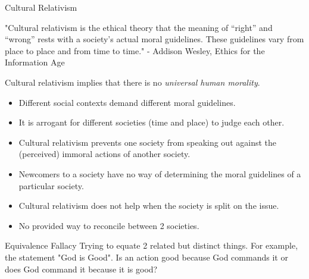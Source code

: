 \documentclass[]{../../DefinitionFormat}
\begin{document}
\begin{definition}{Cultural Relativism}
	\begin{summary}
		"Cultural relativism is the ethical theory that the meaning of “right” and “wrong”
		rests with a society’s actual moral guidelines. These guidelines vary from place to place
		and from time to time." - Addison Wesley, Ethics for the Information Age
	\end{summary}
	
	\par Cultural relativism implies that there is no \textit{universal human morality}.
	
	\renewcommand{\labelitemi}{$+$}
	\begin{itemize}
		\item Different social contexts demand different moral guidelines.
		\item It is arrogant for different societies (time and place) to judge each other.
	\end{itemize}
	\renewcommand{\labelitemi}{$-$}
	\begin{itemize}
		\item Cultural relativism prevents one society from speaking out against the (perceived) immoral actions of another society.
		\item Newcomers to a society have no way of determining the moral guidelines of a particular society.
		\item Cultural relativism does not help when the society is split on the issue.
		\item No provided way to reconcile between 2 societies.
	\end{itemize}
\end{definition}

\begin{definition}{Equivalence Fallacy}
	Trying to equate 2 related but distinct things. For example, the statement "God is Good". Is an action good because God commands it or does God command it because it is good?
\end{definition}
\end{document}
